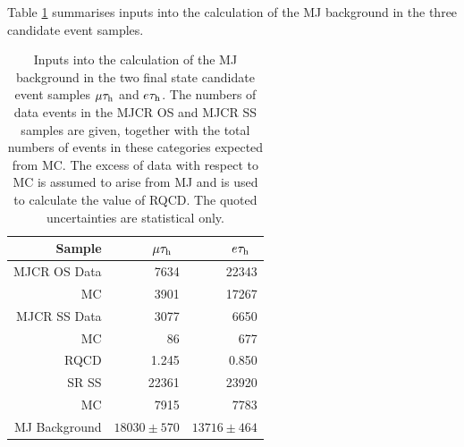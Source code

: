 Table \ref{tab:MJ} summarises inputs into the calculation of the MJ background in the three candidate event samples. 
\begin{table}[htbp]
	\centering
	\begin{tabular}{rrr}
		Sample &             $\mu \tau_\text{h}$\ & $e \tau_\text{h}$\  \\
		\toprule
		MJCR OS Data &       7634    & 22343   \\
		MC          &       3901    & 17267   \\ 
		MJCR SS Data &       3077    & 6650     \\
		MC      &       86      & 677     \\
		\toprule
		RQCD      &      1.245   & 0.850  \\
		\toprule
		SR SS     &      22361    & 23920   \\
		MC     &       7915    &  7783   \\
		\toprule
		MJ Background        &      $18030 \pm 570$    & $13716 \pm 464$    \\          
		
		
	\end{tabular}
	\caption{Inputs into the calculation of the MJ background in the two final state candidate event samples  $\mu\tau_\text{h}$ and $e\tau_\text{h}$.
		The numbers of data events in the MJCR OS and MJCR SS samples are given, together with the total numbers of events in these
		categories expected from MC.
		The excess of data with respect to MC is assumed to arise from MJ and is used to calculate the value of RQCD.
		The quoted uncertainties are statistical only.
	}
	\label{tab:MJ}
\end{table}
 